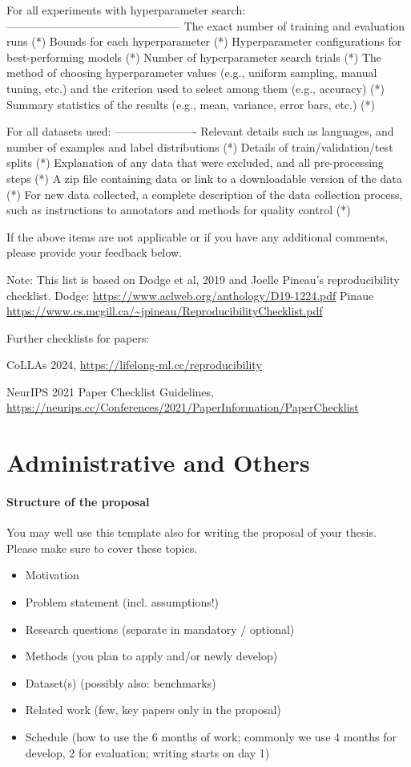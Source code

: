 \documentclass[sigconf, nonacm]{acmart}
\begin{document}
For all experiments with hyperparameter search:
-----------------------------------------------
The exact number of training and evaluation runs (*)
Bounds for each hyperparameter (*)
Hyperparameter configurations for best-performing models (*)
Number of hyperparameter search trials (*)
The method of choosing hyperparameter values (e.g., uniform sampling, manual tuning, etc.) and the criterion used to select among them (e.g., accuracy) (*)
Summary statistics of the results (e.g., mean, variance, error bars, etc.) (*)

For all datasets used:
----------------------
Relevant details such as languages, and number of examples and label distributions (*)
Details of train/validation/test splits (*)
Explanation of any data that were excluded, and all pre-processing steps (*)
A zip file containing data or link to a downloadable version of the data (*)
For new data collected, a complete description of the data collection process, such as instructions to annotators and methods for quality control (*)

If the above items are not applicable or if you have any additional comments, please provide your feedback below. 

Note:
This list is based on Dodge et al, 2019 and Joelle Pineau's reproducibility checklist.
Dodge: \url{https://www.aclweb.org/anthology/D19-1224.pdf}
Pinaue \url{https://www.cs.mcgill.ca/~jpineau/ReproducibilityChecklist.pdf}

Further checklists for papers:

CoLLAs 2024, \url{https://lifelong-ml.cc/reproducibility}

NeurIPS 2021 Paper Checklist Guidelines, \url{https://neurips.cc/Conferences/2021/PaperInformation/PaperChecklist}


\section{Administrative and Others}

\paragraph{Structure of the proposal}

You may well use this template also for writing the proposal of your thesis.
Please make sure to cover these topics.

\begin{itemize}
    \item Motivation
    \item Problem statement (incl. assumptions!)
    \item Research questions (separate in mandatory / optional)
    \item Methods (you plan to apply and/or newly develop)
    \item Dataset(s) (possibly also: benchmarks)
    \item Related work (few, key papers only in the proposal)
    \item Schedule (how to use the 6 months of work; commonly we use 4 months for develop, 2 for evaluation; writing starts on day 1)
\end{itemize}
\end{document}
